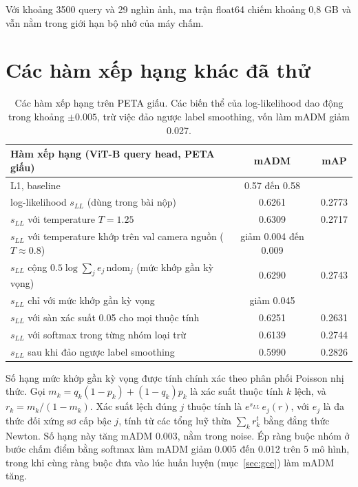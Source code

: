 \documentclass[11pt,a4paper]{article}
\newcommand{\ndom}{\mathrm{ndom}}
\begin{document}
Với khoảng 3500 query và 29 nghìn ảnh, ma trận float64 chiếm khoảng 0,8 GB và vẫn nằm trong giới hạn bộ nhớ của máy chấm.

\section{Các hàm xếp hạng khác đã thử}
\label{app:scores}

\begin{table}[H]
\centering\small
\begin{tabularx}{\linewidth}{@{}Xcc@{}}
\toprule
Hàm xếp hạng (ViT-B query head, PETA giấu) & mADM & mAP \\
\midrule
L1, baseline~\cite{upar} & 0.57 đến 0.58 & \\
log-likelihood $s_{LL}$ (dùng trong bài nộp) & 0.6261 & 0.2773 \\
$s_{LL}$ với temperature $T=1.25$ & 0.6309 & 0.2717 \\
$s_{LL}$ với temperature khớp trên val camera nguồn ($T\approx0.8$) & giảm 0.004 đến 0.009 & \\
$s_{LL}$ cộng $0.5\log\sum_j e_j\,\ndom_j$ (mức khớp gần kỳ vọng) & 0.6290 & 0.2743 \\
$s_{LL}$ chỉ với mức khớp gần kỳ vọng & giảm 0.045 & \\
$s_{LL}$ với sàn xác suất 0.05 cho mọi thuộc tính & 0.6251 & 0.2631 \\
$s_{LL}$ với softmax trong từng nhóm loại trừ & 0.6139 & 0.2744 \\
$s_{LL}$ sau khi đảo ngược label smoothing & 0.5990 & 0.2826 \\
\bottomrule
\end{tabularx}
\caption{Các hàm xếp hạng trên PETA giấu. Các biến thể của log-likelihood dao động trong khoảng $\pm0.005$, trừ việc đảo ngược label smoothing, vốn làm mADM giảm 0.027.}
\label{tab:scores}
\end{table}

Số hạng mức khớp gần kỳ vọng được tính chính xác theo phân phối Poisson nhị thức. Gọi $m_k=q_k(1-p_k)+(1-q_k)p_k$ là xác suất thuộc tính $k$ lệch, và $r_k=m_k/(1-m_k)$. Xác suất lệch đúng $j$ thuộc tính là $e^{s_{LL}}\,e_j(r)$, với $e_j$ là đa thức đối xứng sơ cấp bậc $j$, tính từ các tổng luỹ thừa $\sum_k r_k^t$ bằng đẳng thức Newton. Số hạng này tăng mADM 0.003, nằm trong noise. Ép ràng buộc nhóm ở bước chấm điểm bằng softmax làm mADM giảm 0.005 đến 0.012 trên 5 mô hình, trong khi cùng ràng buộc đưa vào lúc huấn luyện (mục~\ref{sec:gce}) làm mADM tăng.
\end{document}
